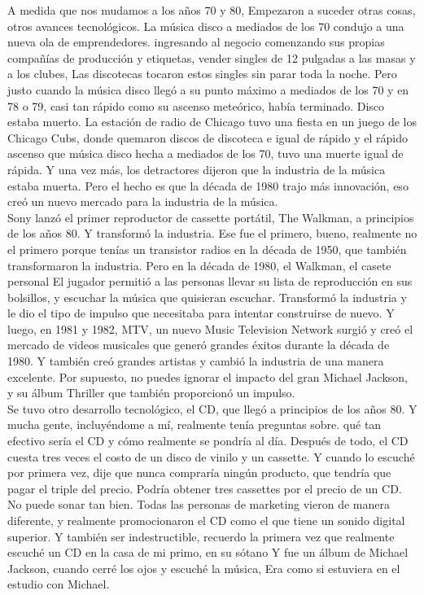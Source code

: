\documentclass[10pt]{book}
\begin{document}
A medida que nos mudamos a los años 70 y 80, Empezaron a suceder otras cosas, otros avances tecnológicos. La música disco a mediados de los 70 condujo a una nueva ola de emprendedores. ingresando al negocio comenzando sus propias compañías de producción y etiquetas, vender singles de 12 pulgadas a las masas y a los clubes, Las discotecas tocaron estos singles sin parar toda la noche. Pero justo cuando la música disco llegó a su punto máximo a mediados de los 70 y en 78 o 79, casi tan rápido como su ascenso meteórico, había terminado.  Disco estaba muerto. La estación de radio de Chicago tuvo una fiesta en un juego de los Chicago Cubs, donde quemaron discos de discoteca e igual de rápido y el rápido ascenso que música disco hecha a mediados de los 70, tuvo una muerte igual de rápida. Y una vez más, los detractores dijeron que la industria de la música estaba muerta. Pero el hecho es que la década de 1980 trajo más innovación, eso creó un nuevo mercado para la industria de la música.\\
Sony lanzó el primer reproductor de cassette portátil, The Walkman, a principios de los años 80. Y transformó la industria. Ese fue el primero, bueno, realmente no el primero porque tenías un transistor radios en la década de 1950, que también transformaron la industria. Pero en la década de 1980, el Walkman, el casete personal El jugador permitió a las personas llevar su lista de reproducción en sus bolsillos, y escuchar la música que quisieran escuchar. Transformó la industria y le dio el tipo de impulso que necesitaba para intentar construirse de nuevo. Y luego, en 1981 y 1982, MTV, un nuevo Music Television Network surgió y creó el mercado de videos musicales que generó grandes éxitos durante la década de 1980. Y también creó grandes artistas y cambió la industria de una manera excelente. Por supuesto, no puedes ignorar el impacto del gran Michael Jackson, y su álbum Thriller que también proporcionó un impulso.\\
Se tuvo otro desarrollo tecnológico, el CD, que llegó a principios de los años 80. Y mucha gente, incluyéndome a mí, realmente tenía preguntas sobre. qué tan efectivo sería el CD y cómo realmente se pondría al día. Después de todo, el CD cuesta tres veces el costo de un disco de vinilo y un cassette. Y cuando lo escuché por primera vez, dije que nunca compraría ningún producto, que tendría que pagar el triple del precio. Podría obtener tres cassettes por el precio de un CD. No puede sonar tan bien. Todas las personas de marketing vieron de manera diferente, y realmente promocionaron el CD como el que tiene un sonido digital superior. Y también ser indestructible, recuerdo la primera vez que realmente escuché un CD en la casa de mi primo, en su sótano Y fue un álbum de Michael Jackson, cuando cerré los ojos y escuché la música, Era como si estuviera en el estudio con Michael.\\
\end{document}
